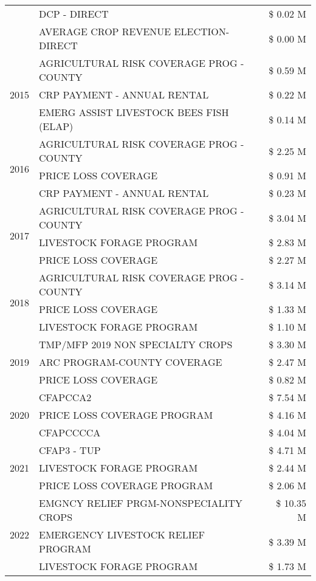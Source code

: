 \begin{tabular}{llr}
 & DCP - DIRECT & \$ 0.02 M \\
 & AVERAGE CROP REVENUE ELECTION-DIRECT & \$ 0.00 M \\
\cline{1-3}
\multirow[t]{3}{*}{2015} & AGRICULTURAL RISK COVERAGE PROG - COUNTY & \$ 0.59 M \\
 & CRP PAYMENT - ANNUAL RENTAL & \$ 0.22 M \\
 & EMERG ASSIST LIVESTOCK BEES FISH (ELAP) & \$ 0.14 M \\
\cline{1-3}
\multirow[t]{3}{*}{2016} & AGRICULTURAL RISK COVERAGE PROG - COUNTY & \$ 2.25 M \\
 & PRICE LOSS COVERAGE & \$ 0.91 M \\
 & CRP PAYMENT - ANNUAL RENTAL & \$ 0.23 M \\
\cline{1-3}
\multirow[t]{3}{*}{2017} & AGRICULTURAL RISK COVERAGE PROG - COUNTY & \$ 3.04 M \\
 & LIVESTOCK FORAGE PROGRAM & \$ 2.83 M \\
 & PRICE LOSS COVERAGE & \$ 2.27 M \\
\cline{1-3}
\multirow[t]{3}{*}{2018} & AGRICULTURAL RISK COVERAGE PROG - COUNTY & \$ 3.14 M \\
 & PRICE LOSS COVERAGE & \$ 1.33 M \\
 & LIVESTOCK FORAGE PROGRAM & \$ 1.10 M \\
\cline{1-3}
\multirow[t]{3}{*}{2019} & TMP/MFP 2019 NON SPECIALTY CROPS & \$ 3.30 M \\
 & ARC PROGRAM-COUNTY COVERAGE & \$ 2.47 M \\
 & PRICE LOSS COVERAGE & \$ 0.82 M \\
\cline{1-3}
\multirow[t]{3}{*}{2020} & CFAPCCA2 & \$ 7.54 M \\
 & PRICE LOSS COVERAGE PROGRAM & \$ 4.16 M \\
 & CFAPCCCCA & \$ 4.04 M \\
\cline{1-3}
\multirow[t]{3}{*}{2021} & CFAP3 - TUP & \$ 4.71 M \\
 & LIVESTOCK FORAGE PROGRAM & \$ 2.44 M \\
 & PRICE LOSS COVERAGE PROGRAM & \$ 2.06 M \\
\cline{1-3}
\multirow[t]{3}{*}{2022} & EMGNCY RELIEF PRGM-NONSPECIALITY CROPS & \$ 10.35 M \\
 & EMERGENCY LIVESTOCK RELIEF PROGRAM & \$ 3.39 M \\
 & LIVESTOCK FORAGE PROGRAM & \$ 1.73 M \\
\cline{1-3}
\bottomrule
\end{tabular}
